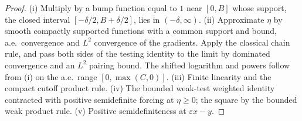 \begin{proof}
  \leanok
  (i) Multiply by a bump function equal to $1$ near $[0,B]$ whose support, the closed interval $[-\delta/2,B+\delta/2]$, lies in $(-\delta,\infty)$.
  (ii) Approximate $\eta$ by smooth compactly supported functions with a common support and bound, a.e.\ convergence and $L^2$ convergence of the
  gradients. Apply the classical chain rule, and pass both sides of the testing identity to the limit by dominated convergence and an $L^2$
  pairing bound. The shifted logarithm and powers follow from (i) on the a.e.\ range $[0,\max(C,0)]$. (iii) Finite linearity and the compact
  cutoff product rule. (iv) The bounded weak-test weighted identity contracted with positive semidefinite forcing at $\eta\ge0$; the square by the
  bounded weak product rule. (v) Positive semidefiniteness at $\varepsilon x-y$.
\end{proof}

